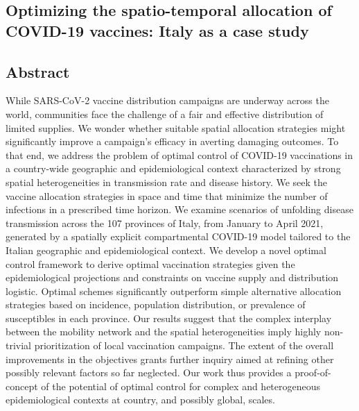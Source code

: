 \begin{fullwidth}
	\chapter{Optimizing the spatio-temporal allocation of COVID-19 vaccines: Italy as a case study}
\label{ch:covid-italy-ocp}


\section{Abstract}
While SARS-CoV-2 vaccine distribution campaigns are underway across the world, communities face the challenge of a fair and effective distribution of limited supplies. We wonder whether suitable spatial allocation strategies might significantly improve a campaign's efficacy in averting damaging outcomes. To that end, we address the problem of optimal control of COVID-19 vaccinations in a country-wide geographic and epidemiological context characterized by strong spatial heterogeneities in transmission rate and disease history. We seek the vaccine allocation strategies in space and time that minimize the number of infections in a prescribed time horizon. We examine scenarios of unfolding disease transmission across the 107 provinces of Italy, from January to April 2021, generated by a spatially explicit compartmental COVID-19 model tailored to the Italian geographic and epidemiological context. We develop a novel optimal control framework to derive optimal vaccination strategies given the epidemiological projections and constraints on vaccine supply and distribution logistic. Optimal schemes significantly outperform simple alternative allocation strategies based on incidence, population distribution, or prevalence of susceptibles in each province. Our results suggest that the complex interplay between the mobility network and the spatial heterogeneities imply highly non-trivial prioritization of local vaccination campaigns. The extent of the overall improvements in the objectives grants further inquiry aimed at refining other possibly relevant factors so far neglected. Our work thus provides a proof-of-concept of the potential of optimal control for complex and heterogeneous epidemiological contexts at country, and possibly global, scales.
\end{fullwidth}

